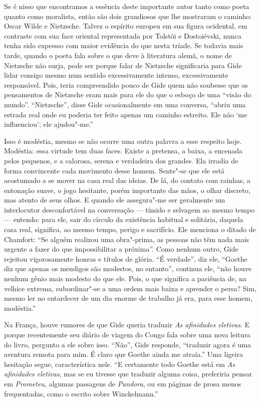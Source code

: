 Se é nisso que encontramos a essência deste importante autor tanto como
poeta quanto como moralista, então são dois grandiosos que lhe mostraram o
caminho: Oscar Wilde e Nietzsche. Talvez o espírito
europeu em sua figura ocidental, em contraste com sua face oriental
representada por Tolstói e Dostoiévski, nunca tenha sido expresso com
maior evidência do que nesta tríade. Se todavia mais tarde, quando o
poeta fala sobre o que deve à literatura alemã, o nome de
Nietzsche não surja, pode ser porque falar de Nietzsche
significaria para Gide lidar consigo mesmo num sentido excessivamente
intenso, excessivamente responsável. Pois, teria compreendido pouco de
Gide quem não soubesse que os pensamentos de Nietzsche eram mais para
ele do que o esboço de uma ``visão do mundo''. ``Nietzsche'', disse Gide
ocasionalmente em uma conversa, ``abriu uma estrada real onde eu
poderia ter feito apenas um caminho estreito. Ele não `me influenciou';
ele ajudou"-me.''

Isso é modéstia, mesmo se não ocorre uma outra palavra a esse respeito hoje.
Modéstia: essa virtude tem duas faces. Existe a pretensa, a baixa, a
encenada pelos pequenos, e a calorosa, serena e verdadeira dos grandes. Ela
irradia de forma convincente cada movimento desse homem. Sente"-se que ele está
acostumado a se mover na casa real das ideias. De lá, do contato com
rainhas, a entonação suave, o jogo hesitante, porém importante das
mãos, o olhar discreto, mas atento de seus olhos. E quando ele assegura"-me
ser geralmente um interlocutor desconfortável na conversação --- tímido e
selvagem ao mesmo tempo --- entendo: para ele, sair do círculo da existência habitual e
solitária, daquela casa real, significa, ao mesmo
tempo, perigo e sacrifício. Ele menciona o ditado de Chamfort: ``Se alguém
realizou uma obra"-prima, as pessoas não têm nada mais urgente a fazer do
que impossibilitar a próxima''. Como nenhum outro, Gide rejeitou
vigorosamente honras e títulos de glória. ``É verdade'', diz ele,
``Goethe diz que apenas os mendigos são modestos, no entanto'', continua
ele, ``não houve nenhum gênio mais modesto do que ele. Pois, o que
significa a paciência de, na velhice extrema, subordinar"-se a uma ordem
mais baixa e aprender o persa? Sim, mesmo ler no entardecer de um dia
enorme de trabalho já era, para esse homem, modéstia.''

Na França, houve rumores de que Gide queria traduzir \emph{As afinidades
eletivas}. E porque recentemente seu diário de viagem do Congo fala
sobre uma nova leitura do livro, pergunto a ele sobre isso. ``Não'',
Gide responde, ``traduzir agora é uma aventura remota para mim. É claro
que Goethe ainda me atraía.'' Uma ligeira hesitação segue, característica
nele. ``E certamente todo Goethe está em \emph{As afinidades
eletivas}, mas se eu tivesse que traduzir alguma coisa, preferiria
pensar em \emph{Prometeu}, algumas passagens de \emph{Pandora}, ou em
páginas de prosa menos frequentadas, como o escrito sobre Winckelmann.''

